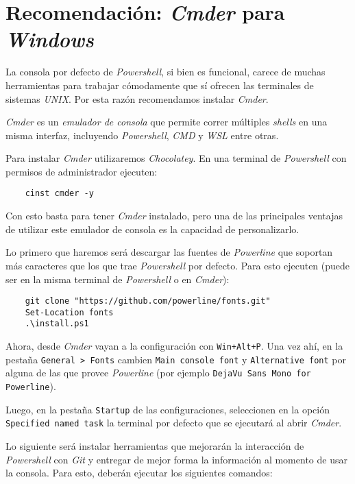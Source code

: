 \chapter{Recomendación: \textit{Cmder} para \textit{Windows}}
  La consola por defecto de \textit{Powershell}, si bien es funcional, carece de muchas 
  herramientas para trabajar cómodamente que sí ofrecen las terminales de sistemas 
  \textit{UNIX}.
  Por esta razón recomendamos instalar \textit{Cmder}.

  \textit{Cmder} es un \textit{emulador de consola} que permite correr múltiples 
  \textit{shells} en una misma interfaz, incluyendo \textit{Powershell}, \textit{CMD} y 
  \textit{WSL} entre otras.

  Para instalar \textit{Cmder} utilizaremos \textit{Chocolatey}.
  En una terminal de \textit{Powershell} con permisos de administrador ejecuten:

  \begin{verbatim}
    cinst cmder -y
  \end{verbatim}

  Con esto basta para tener \textit{Cmder} instalado, pero una de las principales ventajas
  de utilizar este emulador de consola es la capacidad de personalizarlo.

  Lo primero que haremos será descargar las fuentes de \textit{Powerline} que soportan más
  caracteres que los que trae \textit{Powershell} por defecto.
  Para esto ejecuten (puede ser en la misma terminal de \textit{Powershell} o en 
  \textit{Cmder}):

  \begin{verbatim}
    git clone "https://github.com/powerline/fonts.git"
    Set-Location fonts
    .\install.ps1
  \end{verbatim}

  Ahora, desde \textit{Cmder} vayan a la configuración con \texttt{Win+Alt+P}.
  Una vez ahí, en la pestaña \texttt{General > Fonts} cambien \texttt{Main console font} y 
  \texttt{Alternative font} por alguna de las que provee \textit{Powerline} (por ejemplo 
  \texttt{DejaVu Sans Mono for Powerline}).

  Luego, en la pestaña \texttt{Startup} de las configuraciones, seleccionen en la opción
  \texttt{Specified named task} la terminal por defecto que se ejecutará al abrir 
  \textit{Cmder}.

  Lo siguiente será instalar herramientas que mejorarán la interacción de 
  \textit{Powershell} con \textit{Git} y entregar de mejor forma la información al momento 
  de usar la consola.
  Para esto, deberán ejecutar los siguientes comandos:

